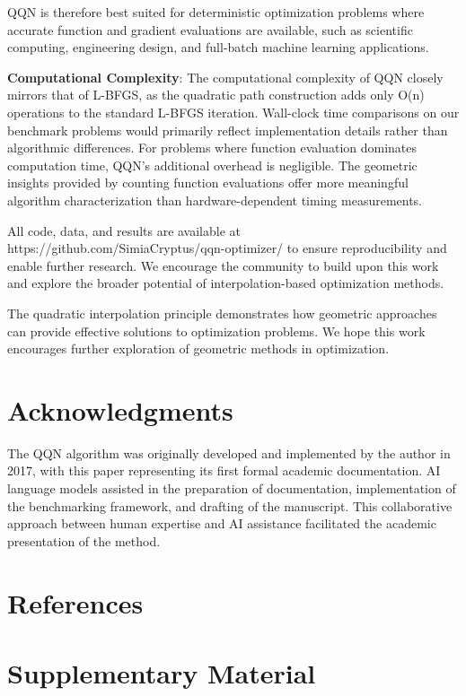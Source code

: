 QQN is therefore best suited for deterministic optimization problems where accurate function and gradient evaluations are available, such as scientific computing, engineering design, and full-batch machine learning applications.

\textbf{Computational Complexity}: The computational complexity of QQN closely mirrors that of L-BFGS, as the quadratic path construction adds only O(n) operations to the standard L-BFGS iteration.
Wall-clock time comparisons on our benchmark problems would primarily reflect implementation details rather than algorithmic differences.
For problems where function evaluation dominates computation time, QQN's additional overhead is negligible.
The geometric insights provided by counting function evaluations offer more meaningful algorithm characterization than hardware-dependent timing measurements.

All code, data, and results are available at https://github.com/SimiaCryptus/qqn-optimizer/ to ensure reproducibility and enable further research.
We encourage the community to build upon this work and explore the broader potential of interpolation-based optimization methods.

The quadratic interpolation principle demonstrates how geometric approaches can provide effective solutions to optimization problems.
We hope this work encourages further exploration of geometric methods in optimization.

\hypertarget{acknowledgments}{%
\section{Acknowledgments}\label{acknowledgments}}

The QQN algorithm was originally developed and implemented by the author in 2017, with this paper representing its first formal academic documentation.
AI language models assisted in the preparation of documentation, implementation of the benchmarking framework, and drafting of the manuscript. This collaborative approach between human expertise and AI assistance facilitated the academic presentation of the method.

\hypertarget{references}{%
\section{References}\label{references}}

\hypertarget{supplementary-material}{%
\section{Supplementary Material}\label{supplementary-material}}

